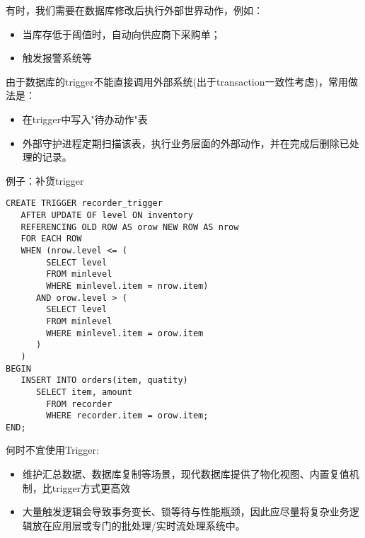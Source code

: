 有时，我们需要在数据库修改后执行外部世界动作，例如：
\begin{itemize}
    \item 当库存低于阈值时，自动向供应商下采购单；
    \item 触发报警系统等
\end{itemize}

由于数据库的trigger不能直接调用外部系统(出于transaction一致性考虑)，常用做法是：
\begin{itemize}
    \item 在trigger中写入"待办动作"表
    \item 外部守护进程定期扫描该表，执行业务层面的外部动作，并在完成后删除已处理的记录。
\end{itemize}

例子：补货trigger

\begin{lstlisting}[style=sqlstyle]
 CREATE TRIGGER recorder_trigger
   AFTER UPDATE OF level ON inventory
   REFERENCING OLD ROW AS orow NEW ROW AS nrow
   FOR EACH ROW
   WHEN (nrow.level <= (
        SELECT level
        FROM minlevel
        WHERE minlevel.item = nrow.item)
      AND orow.level > (
        SELECT level
        FROM minlevel
        WHERE minlevel.item = orow.item
      )
   )
BEGIN
   INSERT INTO orders(item, quatity)
      SELECT item, amount
        FROM recorder
        WHERE recorder.item = orow.item;
END;        
\end{lstlisting}

何时不宜使用Trigger:
\begin{itemize}
    \item 维护汇总数据、数据库复制等场景，现代数据库提供了物化视图、内置复值机制，比trigger方式更高效
    \item 大量触发逻辑会导致事务变长、锁等待与性能瓶颈，因此应尽量将复杂业务逻辑放在应用层或专门的批处理/实时流处理系统中。
\end{itemize}